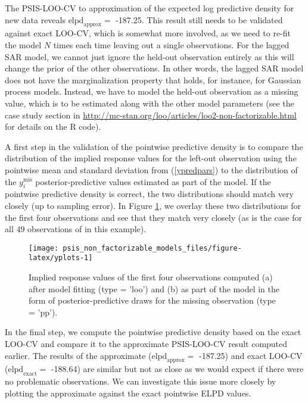 \documentclass[english,,doc,floatsintext]{apa6}
\theoremstyle{definition}
\theoremstyle{definition}
\theoremstyle{definition}
\theoremstyle{remark}
\begin{document}
The PSIS-LOO-CV to approximation of the expected log predictive density
for new data reveals \(\text{elpd}_{\text{approx}} =\) -187.25. This
result still needs to be validated against exact LOO-CV, which is
somewhat more involved, as we need to re-fit the model \(N\) times each
time leaving out a single observations. For the lagged SAR model, we
cannot just ignore the held-out observation entirely as this will change
the prior of the other observations. In other words, the lagged SAR
model does not have the marginalization property that holds, for
instance, for Gaussian process models. Instead, we have to model the
held-out observation as a missing value, which is to be estimated along
with the other model parameters (see the case study section in
\url{http://mc-stan.org/loo/articles/loo2-non-factorizable.html} for
details on the R code).

A first step in the validation of the pointwise predictive density is to
compare the distribution of the implied response values for the left-out
observation using the pointwise mean and standard deviation from
(\ref{ypredpars}) to the distribution of the \(y_i^{\mathrm{mis}}\)
posterior-predictive values estimated as part of the model. If the
pointwise predictive density is correct, the two distributions should
match very closely (up to sampling error). In Figure \ref{fig:yplots},
we overlay these two distributions for the first four observations and
see that they match very closely (as is the case for all \(49\)
observations of in this example).

\begin{figure}
\texttt{[image: psis\_non\_factorizable\_models\_files/figure-latex/yplots-1]} \caption{Implied response values of the first four observations computed (a) after model fitting (type = 'loo') and (b) as part of the model in the form of posterior-predictive draws for the missing observation (type = 'pp').}\label{fig:yplots}
\end{figure}

In the final step, we compute the pointwise predictive density based on
the exact LOO-CV and compare it to the approximate PSIS-LOO-CV result
computed earlier. The results of the approximate
(\(\text{elpd}_{\text{approx}} =\) -187.25) and exact LOO-CV
(\(\text{elpd}_{\text{exact}} =\) -188.64) are similar but not as close
as we would expect if there were no problematic observations. We can
investigate this issue more closely by plotting the approximate against
the exact pointwise ELPD values.
\end{document}
